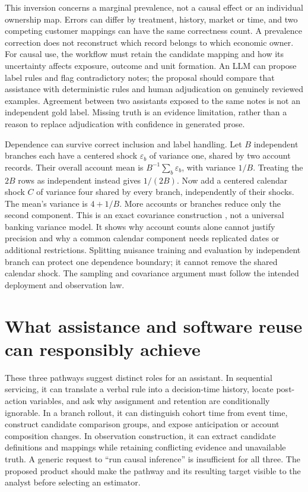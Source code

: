 This inversion concerns a marginal prevalence, not a causal effect or an
individual ownership map. Errors can differ by treatment, history, market or
time, and two competing customer mappings can have the same correctness
count. A prevalence correction does not reconstruct which record belongs to
which economic owner. For causal use, the workflow must retain the candidate
mapping and how its uncertainty affects exposure, outcome and unit formation.
An LLM can propose label rules and flag contradictory notes; the proposal
should compare that assistance with deterministic rules and human adjudication
on genuinely reviewed examples. Agreement between two assistants exposed to
the same notes is not an independent gold label. Missing truth is an evidence
limitation, rather than a reason to replace adjudication with confidence in
generated prose.

Dependence can survive correct inclusion and label handling. Let $B$ independent
branches each have a centered shock $\varepsilon_b$ of variance one, shared
by two account records. Their overall account mean is
$B^{-1}\sum_b\varepsilon_b$, with variance $1/B$. Treating the $2B$ rows as
independent instead gives $1/(2B)$. Now add a centered calendar shock $C$ of
variance four shared by every branch, independently of their shocks. The
mean's variance is $4+1/B$. More accounts or branches reduce only the second
component. This is an exact covariance construction
\cite{exec14_workflow_oracle}, not a universal banking variance model. It
shows why account counts alone cannot justify precision and why a common
calendar component needs replicated dates or additional restrictions.
Splitting nuisance training and evaluation by independent branch can protect
one dependence boundary; it cannot remove the shared calendar shock. The
sampling and covariance argument must follow the intended deployment and
observation law.

\section{What assistance and software reuse can responsibly achieve}
\label{exec14:l5-handoffs}

These three pathways suggest distinct roles for an assistant. In sequential
servicing, it can translate a verbal rule into a decision-time history, locate
post-action variables, and ask why assignment and retention are conditionally
ignorable. In a branch rollout, it can distinguish cohort time from event time,
construct candidate comparison groups, and expose anticipation or account
composition changes. In observation construction, it can extract candidate
definitions and mappings while retaining conflicting evidence and unavailable
truth. A generic request to ``run causal inference'' is insufficient for all
three. The proposed product should make the pathway and its resulting target
visible to the analyst before selecting an estimator.

